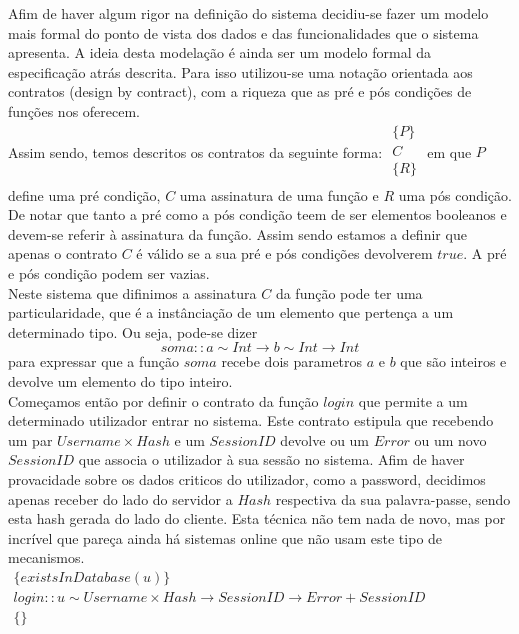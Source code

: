 \newcommand{\rarrow}{\rightarrow}
\newcommand{\larrow}{\leftarrow}
\newcommand{\unif}{\sim}
\def\prop#1#2#3{\noindent$\begin{array}{l} \{#1\} \\ #2 \\ \{#3\} \\ \end{array}$}

Afim de haver algum rigor na definição do sistema decidiu-se fazer um modelo mais formal do ponto de vista dos dados e das funcionalidades que o sistema apresenta.
A ideia desta modelação é ainda ser um modelo formal da especificação atrás descrita. Para isso utilizou-se uma notação orientada aos contratos (design by contract),
com a riqueza que as pré e pós condições de funções nos oferecem.\\

Assim sendo, temos descritos os contratos da seguinte forma: \prop{P}{C}{R} em que $P$ define uma pré condição, $C$ uma assinatura de uma função e $R$ uma pós condição.
De notar que tanto a pré como a pós condição teem de ser elementos booleanos e devem-se referir à assinatura da função. Assim sendo estamos a definir que apenas o contrato $C$
é válido se a sua pré e pós condições devolverem $true$. A pré e pós condição podem ser vazias.\\

Neste sistema que difinimos a assinatura $C$ da função pode ter uma particularidade, que é a instânciação de um elemento que pertença a um determinado tipo.
Ou seja, pode-se dizer $$soma :: a \unif Int \rarrow b \unif Int \rarrow Int$$ para expressar que a função $soma$ recebe dois parametros $a$ e $b$ que são inteiros e devolve
um elemento do tipo inteiro.\\

Começamos então por definir o contrato da função $login$ que permite a um determinado utilizador entrar no sistema. Este contrato estipula que recebendo um par
$Username \times Hash$ e um $SessionID$ devolve ou um $Error$ ou um novo $SessionID$ que associa o utilizador à sua sessão no sistema. Afim de haver provacidade
sobre os dados criticos do utilizador, como a password, decidimos apenas receber do lado do servidor a $Hash$ respectiva da sua palavra-passe, sendo esta hash
gerada do lado do cliente. Esta técnica não tem nada de novo, mas por incrível que pareça ainda há sistemas online que não usam este tipo de mecanismos.\\

\prop
{existsInDatabase(u)}
{login :: u \unif Username \times Hash \rarrow SessionID \rarrow Error + SessionID}
{ }

